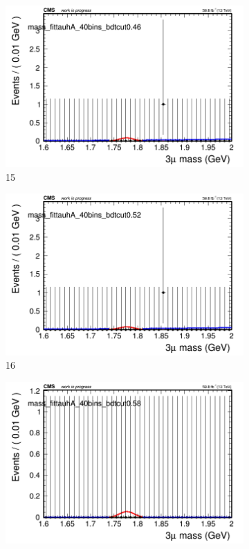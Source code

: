 \begin{figure}[h!]
\begin{subfigure}{0.2\textwidth}
        \includegraphics[width=\textwidth]{power_law/plots/tauhA/massfit_tauhA_40bins_bdtcut0.46.png}
        \caption{15}
    \end{subfigure}
    \begin{subfigure}{0.2\textwidth}
        \includegraphics[width=\textwidth]{power_law/plots/tauhA/massfit_tauhA_40bins_bdtcut0.52.png}
        \caption{16}
    \end{subfigure}
    \begin{subfigure}{0.2\textwidth}
        \includegraphics[width=\textwidth]{power_law/plots/tauhA/massfit_tauhA_40bins_bdtcut0.58.png}

\end{subfigure}
\end{figure}
